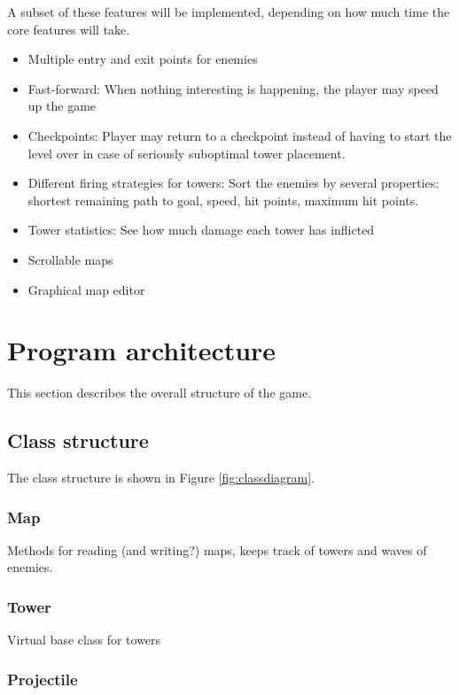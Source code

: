 \documentclass[11pt]{article}
\begin{document}
   A subset of these features will be implemented, depending on how
   much time the core features will take.

\begin{itemize}
\item Multiple entry and exit points for enemies
\item Fast-forward: When nothing interesting is happening, the player
    may speed up the game
\item Checkpoints: Player may return to a checkpoint instead of having
    to start the level over in case of seriously suboptimal tower
    placement.
\item Different firing strategies for towers: Sort the enemies by
    several properties: shortest remaining path to goal, speed, hit
    points, maximum hit points.
\item Tower statistics: See how much damage each tower has inflicted
\item Scrollable maps
\item Graphical map editor
\end{itemize}
\section{Program architecture}
\label{sec-3}

This section describes the overall structure of the game.

\subsection{Class structure}

The class structure is shown in Figure \ref{fig:classdiagram}.

\label{sec-3_2}
\subsubsection*{Map}
\label{sec-3_2_1}

    Methods for reading (and writing?) maps, keeps track of towers and waves of enemies. 
\subsubsection*{Tower}
\label{sec-3_2_2}

    Virtual base class for towers
\subsubsection*{Projectile}
\label{sec-3_2_3}
\end{document}
